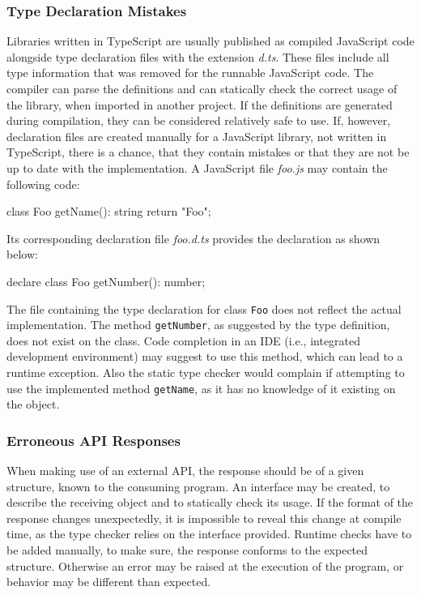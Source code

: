 \subsubsection{Type Declaration Mistakes}

Libraries written in TypeScript are usually published as compiled JavaScript code alongside type declaration files with the extension \emph{d.ts}. These files include all type information that was removed for the runnable JavaScript code. The compiler can parse the definitions and can statically check the correct usage of the library, when imported in another project. If the definitions are generated during compilation, they can be considered relatively safe to use. If, however, declaration files are created manually for a JavaScript library, not written in TypeScript, there is a chance, that they contain mistakes or that they are not be up to date with the implementation. A JavaScript file \emph{foo.js} may contain the following code:
\begin{JsCode}[numbers=none]
class Foo {
  getName(): string {
    return "Foo";
  }
}
\end{JsCode}
Its corresponding declaration file \emph{foo.d.ts} provides the declaration as shown below:
\begin{JsCode}[numbers=none]
declare class Foo {
  getNumber(): number;
}
\end{JsCode}
The file containing the type declaration for class \texttt{Foo} does not reflect the actual implementation. The method \texttt{getNumber}, as suggested by the type definition, does not exist on the class. Code completion in an IDE (i.e., integrated development environment) may suggest to use this method, which can lead to a runtime exception. Also the static type checker would complain if attempting to use the implemented method \texttt{getName}, as it has no knowledge of it existing on the object.

\subsubsection{Erroneous API Responses}

When making use of an external API, the response should be of a given structure, known to the consuming program. An interface may be created, to describe the receiving object and to statically check its usage. If the format of the response changes unexpectedly, it is impossible to reveal this change at compile time, as the type checker relies on the interface provided. Runtime checks have to be added manually, to make sure, the response conforms to the expected structure. Otherwise an error may be raised at the execution of the program, or behavior may be different than expected.

